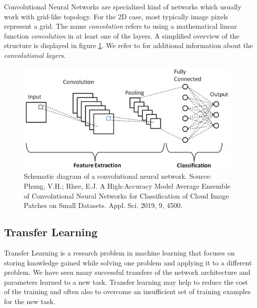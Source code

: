 Convolutional Neural Networks are specialized kind of networks which usually work with grid-like topology. For the 2D case, most typically image pixels represent a grid. The name \emph{convolution} refers to using a mathematical linear function \emph{convolution} in at least one of the layers. A simplified overview of the structure is displayed in figure \ref{fig:convolution_neural_network}. We refer to \cite{Goodfellow-et-al-2016} for additional information about the \emph{convolutional layers}.

\begin{figure}
    \centering
    \includegraphics[width=0.98\textwidth]{img/convolution_neural_network.jpg}
    \caption[Schematic diagram of a convolutional neural network]{Schematic diagram of a convolutional neural network. Source: Phung, V.H.; Rhee, E.J. A High-Accuracy Model Average Ensemble of Convolutional Neural Networks for Classification of Cloud Image Patches on Small Datasets. Appl. Sci. 2019, 9, 4500.}
    \label{fig:convolution_neural_network}
\end{figure}

\subsection{Transfer Learning}

Transfer Learning is a research problem in machine learning that focuses on storing knowledge gained while solving one problem and applying it to a different problem. We have seen many successful transfers of the network architecture and parameters learned to a new task. Transfer learning may help to reduce the cost of the training and often also to overcome an insufficient set of training examples for the new task.

